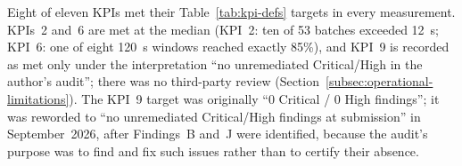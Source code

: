 Eight of eleven KPIs met their Table~\ref{tab:kpi-defs} targets in every measurement. KPIs~2 and~6 are met at the median (KPI~2: ten of 53 batches exceeded 12~s; KPI~6: one of eight 120~s windows reached exactly 85\%), and KPI~9 is recorded as met only under the interpretation ``no unremediated Critical/High in the author's audit''; there was no third-party review (Section~\ref{subsec:operational-limitations}). The KPI~9 target was originally ``0 Critical / 0 High findings''; it was reworded to ``no unremediated Critical/High findings at submission'' in September~2026, after Findings~B and~J were identified, because the audit's purpose was to find and fix such issues rather than to certify their absence.
